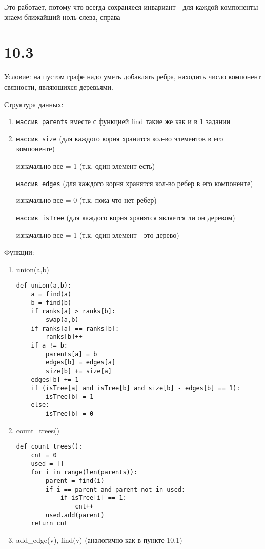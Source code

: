 \documentclass[12pt]{article}
\begin{document}
Это работает, потому что всегда сохраняеся инвариант - для каждой компоненты знаем ближайший ноль слева, справа

\section{10.3}
Условие: на пустом графе надо уметь добавлять ребра, находить число компонент связности, являющихся деревьями.

Структура данных:
\begin{enumerate}
    \item \texttt{массив parents} 
    вместе с функцией find такие же как и в 1 задании
    \item \texttt{массив size} (для каждого корня хранится кол-во элементов в его компоненте)
    
    изначально все = 1 (т.к. один элемент есть)
    
    \tiem \texttt{массив edges} (для каждого корня хранятся кол-во ребер в его компоненте)
    
    изначально все = 0  (т.к. пока что нет ребер)
    
    \tiem \texttt{массив isTree} (для каждого корня хранятся является ли он деревом)
    
    изначально все = 1 (т.к. один элемент - это дерево)
\end{enumerate}

Функции:
\begin{enumerate}
    \item union(a,b)
\begin{lstlisting}
def union(a,b):
    a = find(a)
    b = find(b)
    if ranks[a] > ranks[b]:
        swap(a,b)
    if ranks[a] == ranks[b]:
        ranks[b]++
    if a != b:
        parents[a] = b
        edges[b] = edges[a]
        size[b] += size[a]
    edges[b] += 1
    if (isTree[a] and isTree[b] and size[b] - edges[b] == 1):
        isTree[b] = 1
    else:
        isTree[b] = 0
\end{lstlisting}
\item count\_trees()
\begin{lstlisting}
def count_trees():
    cnt = 0
    used = []
    for i in range(len(parents)):
        parent = find(i)
        if i == parent and parent not in used:
            if isTree[i] == 1:
                cnt++
        used.add(parent)
    return cnt
\end{lstlisting}
    \item add\_edge(v), find(v) (аналогично как в пункте 10.1)
\end{enumerate}
\end{document}
